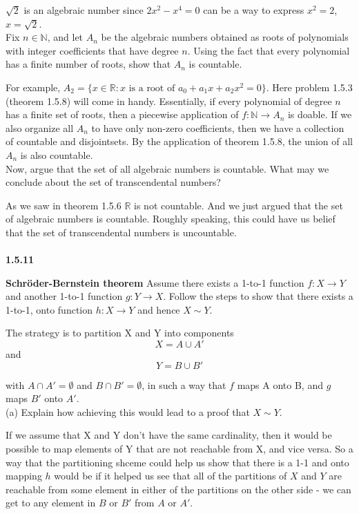 $\sqrt{2}$ is an algebraic number since $2x^2 - x^4 = 0$ can be a way to express $x^2 = 2$, $x = \sqrt{2}$.
\\

Fix $n \in \mathbb{N}$, and let $A_n$ be the algebraic numbers obtained as roots of polynomials with integer coefficients
that have degree $n$.
Using the fact that every polynomial has a finite number of roots, show that $A_n$ is countable.

For example, $A_2 = \{ x\in\mathbb{R} : \text{$x$ is a root of } a_0 + a_1 x + a_2 x^2 = 0 \}$.
Here problem 1.5.3 (theorem 1.5.8) will come in handy.
Essentially, if every polynomial of degree $n$ has a finite set of roots, then a piecewise application of
$f: \mathbb{N} \rightarrow A_n$ is doable.
If we also organize all $A_n$ to have only non-zero coefficients, then we have a collection of countable and disjointsets.
By the application of theorem 1.5.8, the union of all $A_n$ is also countable.
\\

Now, argue that the set of all algebraic numbers is countable.
What may  we conclude about the set of transcendental numbers?

As we saw in theorem 1.5.6 $\mathbb{R}$ is not countable.
And we just argued that the set of algebraic numbers is countable.
Roughly speaking, this could have us belief that the set of transcendental numbers is uncountable.
\\~\\



\textbf{1.5.11}

\textbf{Schröder-Bernstein theorem}
Assume there exists a 1-to-1 function $f: X \rightarrow Y$ and another 1-to-1 function $g: Y \rightarrow X$.
Follow the steps to show that there exists a 1-to-1, onto function $h: X \rightarrow Y$ and hence $X \sim Y$.

The strategy is to partition X and Y into components
$$
X = A \cup A'
$$
and
$$
Y = B \cup B'
$$

with $A \cap A' = \emptyset$ and $B \cap B' = \emptyset$, in such a way that $f$ maps A onto B,
and $g$ maps $B'$ onto $A'$.
\\

(a) Explain how achieving this would lead to a proof that $X \sim Y$.

If we assume that X and Y don't have the same cardinality, then it would be possible to map elements of Y
that are not reachable from X, and vice versa.
So a way that the partitioning shceme could help us show that there is a 1-1 and onto mapping $h$ would be
if it helped us see that all of the partitions of $X$ and $Y$ are reachable from some element in either of the
partitions on the other side - we can get to any element in $B$ or $B'$ from $A$ or $A'$.

